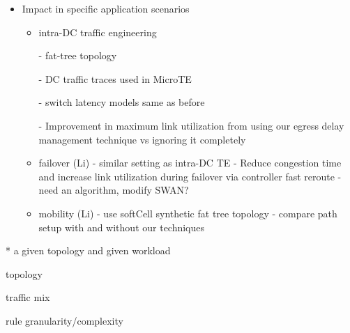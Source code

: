 \begin{itemize}
\begin{itemize}
\end{itemize}

\item Impact in specific application scenarios

\begin{itemize}

\item intra-DC traffic engineering

- fat-tree topology

- DC traffic traces used in MicroTE

- switch latency models same as before

- Improvement in maximum link utilization from using our egress delay management technique vs ignoring it completely
 
\item failover  (Li)
- similar setting as intra-DC TE
- Reduce congestion time and increase link utilization during failover via
controller fast reroute 
- need an algorithm, modify SWAN?

\item mobility (Li)
- use softCell synthetic fat tree topology
- compare path setup with and without our techniques

\end{itemize}

\end{itemize}


* a given topology and given workload

topology

traffic mix

rule granularity/complexity

\fi

